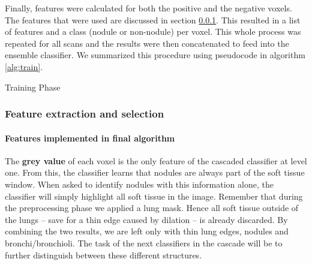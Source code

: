 Finally, features were calculated for both the positive and the negative voxels.
The features that were used are discussed in section \ref{sec:featureExtraction}.
This resulted in a list of features and a class (nodule or non-nodule) per
voxel. This whole process was repeated for all scans and the results were then
concatenated to feed into the ensemble classifier. We summarized
this procedure using pseudocode in algorithm \ref{alg:train}.

\begin{algorithm}[ht]
	\DontPrintSemicolon
	\caption{Training Phase\label{alg:train}}
\end{algorithm}

\subsubsection{Feature extraction and selection} \label{sec:featureExtraction}
\paragraph{Features implemented in final algorithm}
The \textbf{grey value} of each voxel is the only feature of the cascaded
classifier at level one. From this, the classifier learns that nodules are
always part of the soft tissue window. When asked to identify nodules with this
information alone, the classifier will simply highlight all soft tissue in the
image. Remember that during the preprocessing phase we applied a lung mask.
Hence all soft tissue outside of the lungs -- save for a thin edge caused by
dilation -- is already discarded. By combining the two results, we are left only
with thin lung edges, nodules and bronchi/bronchioli. The task of the next
classifiers in the cascade will be to further distinguish between these
different structures.


